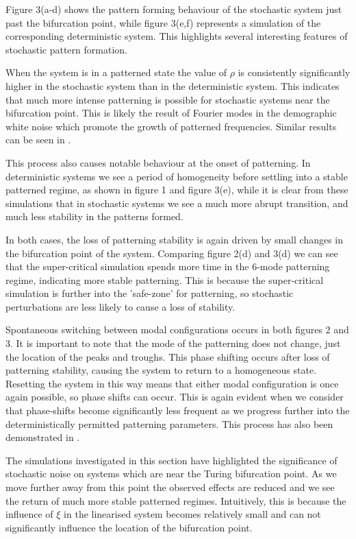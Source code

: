 \documentclass[12pt]{article}
\begin{document}
Figure 3(a-d) shows the pattern forming behaviour of the stochastic system just past the bifurcation point, while figure 3(e,f) represents a simulation of the corresponding deterministic system.  This highlights several interesting features of stochastic pattern formation. 

When the system is in a patterned state the value of $\rho$ is consistently significantly higher in the stochastic system than in the deterministic system. This indicates that much more intense patterning is possible for stochastic systems near the bifurcation point. This is likely the result of Fourier modes in the demographic white noise which promote the growth of patterned frequencies. Similar results can be seen in \cite{Zheng-Ping}.

This process also causes notable behaviour at the onset of patterning. In deterministic systems we see a period of homogeneity before settling into a stable patterned regime, as shown in figure 1 and figure 3(e), while it is clear from these simulations that in stochastic systems we see a much more abrupt transition, and much less stability in the patterns formed. 

In both cases, the loss of patterning stability is again driven by small changes in the bifurcation point of the system. Comparing figure 2(d) and 3(d) we can see that the super-critical simulation spends more time in the 6-mode patterning regime, indicating more stable patterning. This is because the super-critical simulation is further into the 'safe-zone' for patterning, so stochastic perturbations are less likely to cause a loss of stability. 

Spontaneous switching between modal configurations occurs in both figures 2 and 3. It is important to note that the mode of the patterning does not change, just the location of the peaks and troughs. This phase shifting occurs after loss of patterning stability, causing the system to return to a homogeneous state. Resetting the system in this way means that either modal configuration is once again possible, so phase shifts can occur. This is again evident when we consider that phase-shifts become significantly less frequent as we progress further into the deterministically permitted patterning parameters. This process has also been demonstrated in \cite{Maini}. 

The simulations investigated in this section have highlighted the significance of stochastic noise on systems which are near the Turing bifurcation point. As we move further away from this point the observed effects are reduced and we see the return of much more stable patterned regimes. Intuitively, this is because the influence of $\xi$ in the linearised system becomes relatively small and can not significantly influence the location of the bifurcation point.
\end{document}

